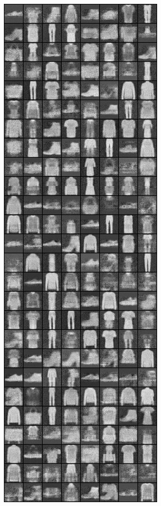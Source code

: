 \begin{figure}
\includegraphics[width=\picwidth\columnwidth]{figures/supplementary/alternative_fmnist/image_2000.png}

\end{figure}
